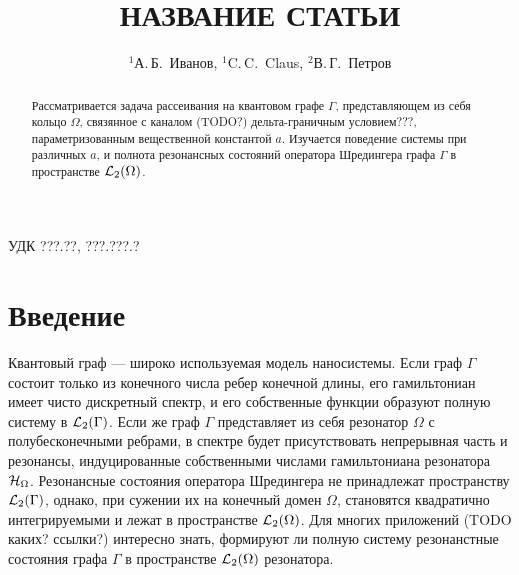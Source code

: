 \documentclass{nsart_eng}
\begin{document}
\title[короткое название статьи]
{НАЗВАНИЕ СТАТЬИ}

\author[А.\,Б.~Иванов, C.\,C.~Claus, В.\,Г.~Петров]
{$^1$А.\,Б.~Иванов, $^{1}$C.\,C.~Claus, $^2$В.\,Г.~Петров}

\address{
$^1$ Санкт-Петербургский Национальный Исследовательский Университет Информационных Технологий, \\
Механики и Оптики,\\
Кронверкский пр., 49, Санкт-Петербург, 197101, Россия\\
$^2$ Swiss Federal University of Technology,\\
Sonneggstrasse, 5,  Zurich, CH-8092, Switzerland }


УДК ???.??, ???.???.?%

\begin{abstract}
Рассматривается задача рассеивания на квантовом графе $\Gamma$, представляющем из себя кольцо $\Omega$, связянное с каналом (TODO?) дельта-граничным условием???, параметризованным вещественной константой $a$. Изучается поведение системы при различных $a$, и полнота резонансных состояний оператора Шредингера графа $\Gamma$ в пространстве $\mathcal{L}_2(\Omega)$.
\end{abstract}


\maketitle

\section{Введение}

Квантовый граф — широко используемая модель наносистемы. Если граф $\Gamma$ состоит только из конечного числа ребер конечной длины, его гамильтониан имеет чисто дискретный спектр, и его собственные функции образуют полную систему в $\mathcal{L}_2(\Gamma)$. Если же граф $\Gamma$ представляет из себя резонатор $\Omega$ с полубесконечными ребрами, в спектре будет присутствовать непрерывная часть и резонансы, индуцированные собственными числами гамильтониана резонатора $\mathcal{H}_\Omega$. Резонансные состояния оператора Шредингера не принадлежат пространству $\mathcal{L}_2(\Gamma)$, однако, при сужении их на конечный домен $\Omega$, становятся квадратично интегрируемыми и лежат в пространстве $\mathcal{L}_2(\Omega)$. Для многих приложений (TODO каких? ссылки?) интересно знать, формируют ли полную систему резонанстные состояния графа $\Gamma$ в пространстве $\mathcal{L}_2(\Omega)$ резонатора.
\end{document}

